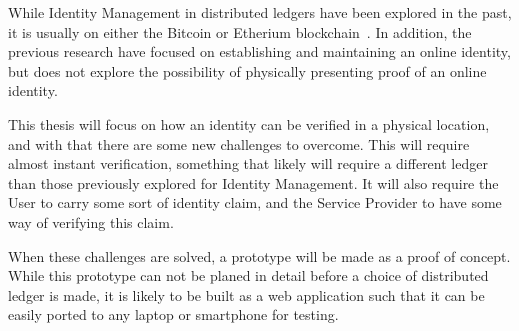 While Identity Management in distributed ledgers have been explored in the past, it is usually on either the Bitcoin or Etherium blockchain~\cite{Azouvi2017,Augot2017}.  In addition, the previous research have focused on establishing and maintaining an online identity, but does not explore the possibility of physically presenting proof of an online identity.

This thesis will focus on how an identity can be verified in a physical location, and with that there are some new challenges to overcome. This will require almost instant verification, something that likely will require a different ledger than those previously explored for Identity Management. It will also require the User to carry some sort of identity claim, and the Service Provider to have some way of verifying this claim. 

When these challenges are solved, a prototype will be made as a proof of concept. While this prototype can not be planed in detail before a choice of distributed ledger is made, it is likely to be built as a web application such that it can be easily ported to any laptop or smartphone for testing.